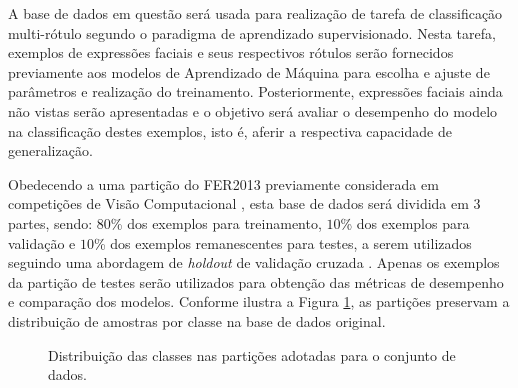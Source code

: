 A base de dados em questão será usada para realização de tarefa de classificação multi-rótulo segundo o paradigma de aprendizado supervisionado. Nesta tarefa, exemplos de expressões faciais e seus respectivos rótulos serão fornecidos previamente aos modelos de Aprendizado de Máquina para escolha e ajuste de parâmetros e realização do treinamento. Posteriormente, expressões faciais ainda não vistas serão apresentadas e o objetivo será avaliar o desempenho do modelo na classificação destes exemplos, isto é, aferir a respectiva capacidade de generalização.

Obedecendo a uma partição do FER2013 previamente considerada em competições de Visão Computacional \cite{Kaggle:FER2013}, esta base de dados será dividida em $3$ partes, sendo: $80$\% dos exemplos para treinamento,  $10$\% dos exemplos para validação e $10$\% dos exemplos remanescentes para testes, a serem utilizados seguindo uma abordagem de \emph{holdout} de validação cruzada  \cite{Brink:MachineLearningLivro}.  Apenas os exemplos da partição de testes serão utilizados para obtenção das métricas de desempenho e comparação dos modelos. Conforme ilustra a Figura \ref{fig:particoes}, as partições preservam a distribuição de amostras por classe na base de dados original.

\begin{figure}[h!]
	\centering
  	\caption{Distribuição das classes nas partições adotadas para o conjunto de dados.} \label{fig:particoes}
\end{figure}

